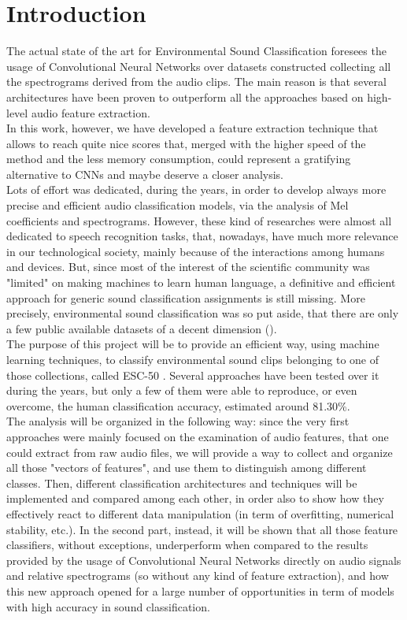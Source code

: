 
\section{Introduction}
\label{sec:introduction}

The actual state of the art for Environmental Sound Classification foresees the usage of Convolutional Neural Networks over datasets constructed collecting all the spectrograms derived from the audio clips. The main reason is that several architectures have been proven to outperform all the approaches based on high-level audio feature extraction.\\
In this work, however, we have developed a feature extraction technique that allows to reach quite nice scores that, merged with the higher speed of the method and the less memory consumption, could represent a gratifying alternative to CNNs and maybe deserve a closer analysis.\\
Lots of effort was dedicated, during the years, in order to develop always more precise and efficient audio classification models, via the analysis of Mel coefficients and spectrograms. However, these kind of researches were almost all dedicated to speech recognition tasks, that, nowadays, have much more relevance in our technological society, mainly because of the interactions among humans and devices. But, since most of the interest of the scientific community was "limited" on making machines to learn human language, a definitive and efficient approach for generic sound classification assignments is still missing. More precisely, environmental sound classification was so put aside, that there are only a few public available datasets of a decent dimension (\cite{piczak2015dataset, urbansound8k}).\\
The purpose of this project will be to provide an efficient way, using machine learning techniques, to classify environmental sound clips belonging to one of those collections, called ESC-50 \cite{piczak2015dataset}. Several approaches have been tested over it during the years, but only a few of them were able to reproduce, or even overcome, the human classification accuracy, estimated around 81.30\%.\\
The analysis will be organized in the following way: since the very first approaches were mainly focused on the examination of audio features, that one could extract from raw audio files, we will provide a way to collect and organize all those "vectors of features", and use them to distinguish among different classes. Then, different classification architectures and techniques will be implemented and compared among each other, in order also to show how they effectively react to different data manipulation (in term of overfitting, numerical stability, etc.). In the second part, instead, it will be shown that all those feature classifiers, without exceptions, underperform when compared to the results provided by the usage of Convolutional Neural Networks directly on audio signals and relative spectrograms (so without any kind of feature extraction), and how this new approach opened for a large number of opportunities in term of models with high accuracy in sound classification.\\